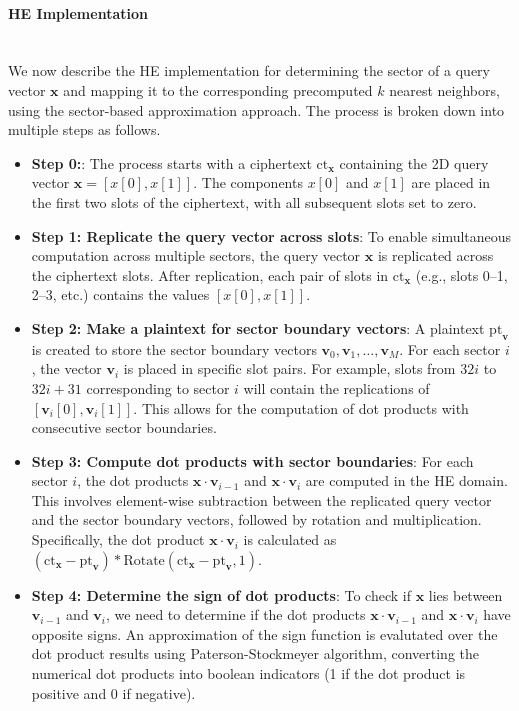 \documentclass[article]{iacrtrans}
\begin{document}
\paragraph{HE Implementation}\mbox{}\\

We now describe the HE implementation for determining the sector of a query vector $\mathbf{x}$ and mapping it to the corresponding precomputed $k$ nearest neighbors, using the sector-based approximation approach. The process is broken down into multiple steps as follows.

\begin{itemize}
    \item \textbf{Step 0:}: The process starts with a ciphertext $\text{ct}_\mathbf{x}$ containing the 2D query vector $\mathbf{x} = [x[0], x[1]]$. The components $x[0]$ and $x[1]$ are placed in the first two slots of the ciphertext, with all subsequent slots set to zero.
    \item \textbf{Step 1: Replicate the query vector across slots}:  To enable simultaneous computation across multiple sectors, the query vector $\mathbf{x}$ is replicated across the ciphertext slots. After replication, each pair of slots in $\text{ct}_\mathbf{x}$ (e.g., slots 0–1, 2–3, etc.) contains the values $[x[0], x[1]]$.
    \item \textbf{Step 2: Make a plaintext for sector boundary vectors}: A plaintext $\text{pt}_\mathbf{v}$ is created to store the sector boundary vectors ${\mathbf{v}_0, \mathbf{v}_1, \dots, \mathbf{v}_M}$. For each sector $i$, the vector $\mathbf{v}_i$ is placed in specific slot pairs. For example, slots from $32i$ to $32i+31$ corresponding to sector $i$ will contain the replications of $[\mathbf{v}_i[0], \mathbf{v}_i[1]]$. This allows for the computation of dot products with consecutive sector boundaries.
    \item \textbf{Step 3: Compute dot products with sector boundaries}: For each sector $i$, the dot products $\mathbf{x} \cdot \mathbf{v}_{i-1}$ and $\mathbf{x} \cdot \mathbf{v}_i$ are computed in the HE domain. This involves element-wise subtraction between the replicated query vector and the sector boundary vectors, followed by rotation and multiplication. Specifically, the dot product $\mathbf{x} \cdot \mathbf{v}_i$ is calculated as $(\text{ct}_\mathbf{x}-\text{pt}_\mathbf{v})*\text{Rotate}(\text{ct}_\mathbf{x}-\text{pt}_\mathbf{v}, 1)$.
    \item \textbf{Step 4: Determine the sign of dot products}: To check if $\mathbf{x}$ lies between $\mathbf{v}_{i-1}$ and $\mathbf{v}_i$, we need to determine if the dot products $\mathbf{x} \cdot \mathbf{v}_{i-1}$ and $\mathbf{x} \cdot \mathbf{v}_i$ have opposite signs. An approximation of the sign function is evalutated over the dot product results using Paterson-Stockmeyer algorithm, converting the numerical dot products into boolean indicators (1 if the dot product is positive and 0 if negative).

\end{itemize}
\end{document}
